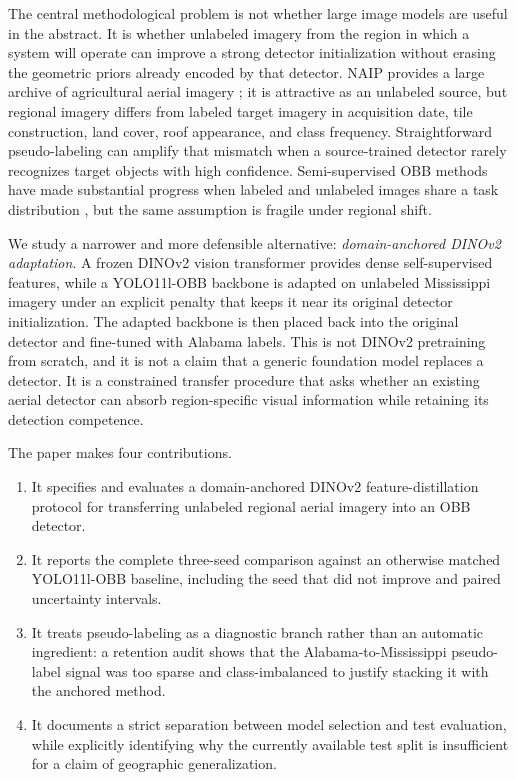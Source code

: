 \documentclass[preprint,12pt,authoryear]{elsarticle}
\begin{document}
The central methodological problem is not whether large image models are useful in the abstract. It is whether unlabeled imagery from the region in which a system will operate can improve a strong detector initialization without erasing the geometric priors already encoded by that detector. NAIP provides a large archive of agricultural aerial imagery \citep{usgsnaip}; it is attractive as an unlabeled source, but regional imagery differs from labeled target imagery in acquisition date, tile construction, land cover, roof appearance, and class frequency. Straightforward pseudo-labeling can amplify that mismatch when a source-trained detector rarely recognizes target objects with high confidence. Semi-supervised OBB methods have made substantial progress when labeled and unlabeled images share a task distribution \citep{hua2023sood}, but the same assumption is fragile under regional shift.

We study a narrower and more defensible alternative: \emph{domain-anchored DINOv2 adaptation}. A frozen DINOv2 vision transformer provides dense self-supervised features, while a YOLO11l-OBB backbone is adapted on unlabeled Mississippi imagery under an explicit penalty that keeps it near its original detector initialization. The adapted backbone is then placed back into the original detector and fine-tuned with Alabama labels. This is not DINOv2 pretraining from scratch, and it is not a claim that a generic foundation model replaces a detector. It is a constrained transfer procedure that asks whether an existing aerial detector can absorb region-specific visual information while retaining its detection competence.

The paper makes four contributions.

\begin{enumerate}
  \item It specifies and evaluates a domain-anchored DINOv2 feature-distillation protocol for transferring unlabeled regional aerial imagery into an OBB detector.
  \item It reports the complete three-seed comparison against an otherwise matched YOLO11l-OBB baseline, including the seed that did not improve and paired uncertainty intervals.
  \item It treats pseudo-labeling as a diagnostic branch rather than an automatic ingredient: a retention audit shows that the Alabama-to-Mississippi pseudo-label signal was too sparse and class-imbalanced to justify stacking it with the anchored method.
  \item It documents a strict separation between model selection and test evaluation, while explicitly identifying why the currently available test split is insufficient for a claim of geographic generalization.
\end{enumerate}
\end{document}
